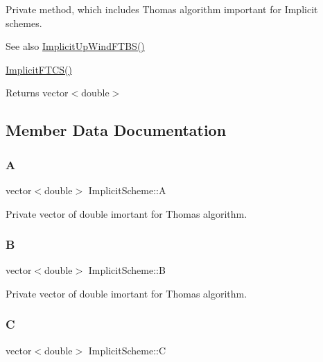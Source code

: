 Private method, which includes Thomas algorithm important for Implicit schemes. \begin{DoxySeeAlso}{See also}
\mbox{\hyperlink{class_implicit_scheme_ab8311a005d69690622e0ddaa0dcff94d}{Implicit\+Up\+Wind\+F\+T\+B\+S()}} 

\mbox{\hyperlink{class_implicit_scheme_afd2b8e73e914a04c326b8cba0d5810ce}{Implicit\+F\+T\+C\+S()}} 
\end{DoxySeeAlso}
\begin{DoxyReturn}{Returns}
vector$<$double$>$ 
\end{DoxyReturn}


\subsection{Member Data Documentation}
\mbox{\label{class_implicit_scheme_a9bd3d0a458683f9a17e8d11016c9f879}} 
\subsubsection{\texorpdfstring{A}{A}}
{\footnotesize\ttfamily vector$<$double$>$ Implicit\+Scheme\+::A\hspace{0.3cm}{\ttfamily [private]}}

Private vector of double imortant for Thomas algorithm. \mbox{\label{class_implicit_scheme_affeedb3fe9f7ebb8be113c884dd09a97}} 
\subsubsection{\texorpdfstring{B}{B}}
{\footnotesize\ttfamily vector$<$double$>$ Implicit\+Scheme\+::B\hspace{0.3cm}{\ttfamily [private]}}

Private vector of double imortant for Thomas algorithm. \mbox{\label{class_implicit_scheme_ab9059b52250e0afdd41b855299e6cf71}} 
\subsubsection{\texorpdfstring{C}{C}}
{\footnotesize\ttfamily vector$<$double$>$ Implicit\+Scheme\+::C\hspace{0.3cm}{\ttfamily [private]}}


